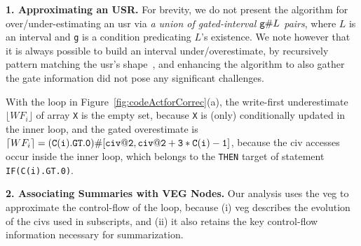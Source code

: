 \documentclass{sig-alternate}
\begin{document}
%
%

\vspace{1ex}


{\bf 1. Approximating an USR.}  %
For brevity, we do not present the algorithm for
over/under-estimating an {\sc usr} via 
{\em a union of gated-interval ${\tt g}\#L$ pairs}, where $L$ is an 
interval and {\tt g} is a condition predicating $L$'s existence.  
%
We note however that it is always possible to build an interval 
under/overestimate, by recursively pattern matching the {\sc usr}'s 
shape~\cite{SummaryMonot}, and enhancing the algorithm to also gather 
the gate information did not pose any significant challenges.
  
%
%
With the loop in Figure~\ref{fig:codeActforCorrec}(a), 
the write-first underestimate $\lfloor WF_i\rfloor$ of array {\tt X} 
is the empty set, because {\tt X} is (only) conditionally updated in 
the inner loop, and the gated overestimate is  
$\lceil WF_i\rceil={\tt{}(C(i).GT.0)}\#[{\tt civ@2, civ@2+3*C(i)-1}]$,
because the {\sc civ} accesses occur inside the inner loop, which
belongs to the {\tt THEN} target of statement {\tt IF(C(i).GT.0)}.
 

\vspace{1ex}

{\bf 2. Associating Summaries with VEG Nodes.}
Our analysis uses the {\sc veg} to approximate the control-flow of
the loop, because (i) {\sc veg} describes the evolution of the 
{\sc civ}s used in subscripts, and (ii) it also retains the 
key control-flow information necessary for summarization. 
\end{document}
